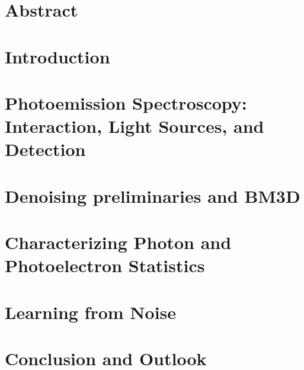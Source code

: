 \documentclass[a4paper,12pt,twoside,openany]{book}
\begin{document}

\chapter*{Abstract}

\tableofcontents

\printglossary[style=tree, type=\acronymtype, title=List of Acronyms]
\printglossary[type=symbols, style=tree, title=List of Symbols]

\printglossary
\glsunsetall
\glsresetall

% 

\chapter{Introduction}


\chapter[Photoemission Spectroscopy: Interaction, Light Sources, and Detection]{Photoemission Spectroscopy:\\Interaction, Light Sources, and Detection}


\chapter{Denoising preliminaries and BM3D}

% 

\chapter{Characterizing Photon and Photoelectron Statistics}\label{ch:pes-statistics}


\chapter{Learning from Noise}\label{ch:deep_learning}


\chapter{Conclusion and Outlook}

\end{document}
